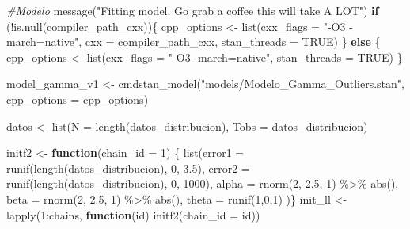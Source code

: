\documentclass[
]{article}
\newenvironment{Shaded}{\begin{snugshade}}{\end{snugshade}}
\newcommand{\AttributeTok}[1]{\textcolor[rgb]{0.77,0.63,0.00}{#1}}
\newcommand{\CommentTok}[1]{\textcolor[rgb]{0.56,0.35,0.01}{\textit{#1}}}
\newcommand{\ConstantTok}[1]{\textcolor[rgb]{0.00,0.00,0.00}{#1}}
\newcommand{\ControlFlowTok}[1]{\textcolor[rgb]{0.13,0.29,0.53}{\textbf{#1}}}
\newcommand{\DecValTok}[1]{\textcolor[rgb]{0.00,0.00,0.81}{#1}}
\newcommand{\FloatTok}[1]{\textcolor[rgb]{0.00,0.00,0.81}{#1}}
\newcommand{\FunctionTok}[1]{\textcolor[rgb]{0.00,0.00,0.00}{#1}}
\newcommand{\NormalTok}[1]{#1}
\newcommand{\OtherTok}[1]{\textcolor[rgb]{0.56,0.35,0.01}{#1}}
\newcommand{\SpecialCharTok}[1]{\textcolor[rgb]{0.00,0.00,0.00}{#1}}
\newcommand{\StringTok}[1]{\textcolor[rgb]{0.31,0.60,0.02}{#1}}
\begin{document}
\begin{Shaded}
\begin{Highlighting}[]
\CommentTok{\#Modelo}
\FunctionTok{message}\NormalTok{(}\StringTok{"Fitting model. Go grab a coffee this will take A LOT"}\NormalTok{)}
\ControlFlowTok{if}\NormalTok{ (}\SpecialCharTok{!}\FunctionTok{is.null}\NormalTok{(compiler\_path\_cxx))\{}
\NormalTok{  cpp\_options }\OtherTok{\textless{}{-}} \FunctionTok{list}\NormalTok{(}\AttributeTok{cxx\_flags =} \StringTok{"{-}O3 {-}march=native"}\NormalTok{, }
                      \AttributeTok{cxx =}\NormalTok{ compiler\_path\_cxx, }\AttributeTok{stan\_threads =} \ConstantTok{TRUE}\NormalTok{)}
\NormalTok{\} }\ControlFlowTok{else}\NormalTok{ \{}
\NormalTok{  cpp\_options }\OtherTok{\textless{}{-}} \FunctionTok{list}\NormalTok{(}\AttributeTok{cxx\_flags =} \StringTok{"{-}O3 {-}march=native"}\NormalTok{, }
                      \AttributeTok{stan\_threads =} \ConstantTok{TRUE}\NormalTok{)}
\NormalTok{\}}

\NormalTok{model\_gamma\_v1 }\OtherTok{\textless{}{-}} \FunctionTok{cmdstan\_model}\NormalTok{(}\StringTok{"models/Modelo\_Gamma\_Outliers.stan"}\NormalTok{,}
                                \AttributeTok{cpp\_options =}\NormalTok{ cpp\_options)}

\NormalTok{datos }\OtherTok{\textless{}{-}} \FunctionTok{list}\NormalTok{(}\AttributeTok{N =} \FunctionTok{length}\NormalTok{(datos\_distribucion), }\AttributeTok{Tobs =}\NormalTok{ datos\_distribucion)}

\NormalTok{initf2 }\OtherTok{\textless{}{-}} \ControlFlowTok{function}\NormalTok{(}\AttributeTok{chain\_id =} \DecValTok{1}\NormalTok{) \{}
  \FunctionTok{list}\NormalTok{(}\AttributeTok{error1       =} \FunctionTok{runif}\NormalTok{(}\FunctionTok{length}\NormalTok{(datos\_distribucion), }\DecValTok{0}\NormalTok{, }\FloatTok{3.5}\NormalTok{), }
       \AttributeTok{error2       =} \FunctionTok{runif}\NormalTok{(}\FunctionTok{length}\NormalTok{(datos\_distribucion), }\DecValTok{0}\NormalTok{, }\DecValTok{1000}\NormalTok{), }
       \AttributeTok{alpha        =} \FunctionTok{rnorm}\NormalTok{(}\DecValTok{2}\NormalTok{, }\FloatTok{2.5}\NormalTok{, }\DecValTok{1}\NormalTok{) }\SpecialCharTok{\%\textgreater{}\%} \FunctionTok{abs}\NormalTok{(),}
       \AttributeTok{beta         =} \FunctionTok{rnorm}\NormalTok{(}\DecValTok{2}\NormalTok{, }\FloatTok{2.5}\NormalTok{, }\DecValTok{1}\NormalTok{) }\SpecialCharTok{\%\textgreater{}\%} \FunctionTok{abs}\NormalTok{(),}
       \AttributeTok{theta        =} \FunctionTok{runif}\NormalTok{(}\DecValTok{1}\NormalTok{,}\DecValTok{0}\NormalTok{,}\DecValTok{1}\NormalTok{)}
\NormalTok{  )\}}
\NormalTok{init\_ll }\OtherTok{\textless{}{-}} \FunctionTok{lapply}\NormalTok{(}\DecValTok{1}\SpecialCharTok{:}\NormalTok{chains, }\ControlFlowTok{function}\NormalTok{(id) }\FunctionTok{initf2}\NormalTok{(}\AttributeTok{chain\_id =}\NormalTok{ id))}


\end{Highlighting}
\end{Shaded}
\end{document}
